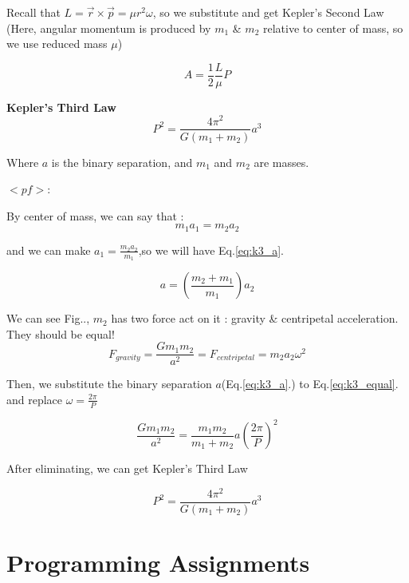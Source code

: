 \documentclass{article}
\begin{document}
Recall that $L=\vec{r}\times\vec{p}=\mu r^2\omega$, so we substitute and get Kepler’s Second Law \\
(Here, angular momentum is produced by $m_1$ \& $m_2$ relative to center of mass, so we use reduced mass $\mu$)

$$A = \frac{1}{2}\frac{L}{\mu}P$$

\textbf{Kepler’s Third Law}
\begin{equation}
    P^2 = \frac{4\pi^2}{G(m_1+m_2)}a^3
    \label{eq:k3}
\end{equation}

Where $a$ is the binary separation, and $m_1$ and $m_2$ are masses.

$<pf> :$

By center of mass, we can say that :
\begin{equation*}
    m_1a_1=m_2a_2
    \label{eq:k3_center}
\end{equation*}

and we can make $a_1=\frac{m_2a_2}{m_1}$,so we will have Eq.\ref{eq:k3_a}.

\begin{equation}
    a=(\frac{m_2+m_1}{m_1})a_2
    \label{eq:k3_a}
\end{equation}

We can see Fig.., $m_2$ has two force act on it : gravity \& centripetal acceleration.
They should be equal!
\begin{equation}
    F_{gravity}=\frac{Gm_1m_2}{a^2}=F_{centripetal}=m_2a_2{\omega}^2
    \label{eq:k3_equal}
\end{equation}

Then, we substitute the binary separation $a$(Eq.\ref{eq:k3_a}.) to Eq.\ref{eq:k3_equal}. and replace $\omega=\frac{2\pi}{P}$

$$\frac{Gm_1m_2}{a^2}
=\frac{m_1m_2}{m_1+m_2}a(\frac{2\pi}{P})^2$$

After eliminating, we can get Kepler's Third Law

$$P^2 = \frac{4\pi^2}{G(m_1+m_2)}a^3$$


\section{Programming Assignments}
\end{document}
